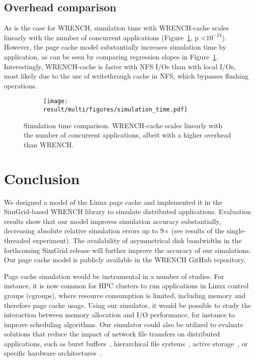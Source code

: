 \documentclass[conference]{IEEEtran}
\newcommand{\simgrid}{SimGrid\xspace}
\newcommand{\wrench}{WRENCH\xspace}
\begin{document}
        \subsection{Overhead comparison}
        As is the case for \wrench, simulation time with \wrench-cache scales
        linearly with the number of concurrent applications
        (Figure~\ref{fig:multi_time}, p \textless $10^{-24}$). However, the page
        cache model substantially increases simulation time by
        application, as can be seen by comparing regression slopes in
        Figure~\ref{fig:multi_time}. Interestingly, \wrench-cache is faster with 
        NFS I/Os than with local I/Os, most likely due to the use of writethrough
        cache in NFS, which bypasses flushing operations.
        \begin{figure}
            \begin{subfigure}{\columnwidth}
                \centering
                \texttt{[image: result/multi/figures/simulation\_time.pdf]}
            \end{subfigure}
            \caption{Simulation time comparison. \wrench-cache scales
            linearly with the number of concurrent applications, albeit
            with a higher overhead than \wrench.}
            \label{fig:multi_time}
            \end{figure}


    \section{Conclusion}
    \label{discussion}
    We designed a model of the Linux page cache and implemented it in the
    \simgrid-based \wrench library to simulate distributed applications.
    Evaluation results show that our model improves simulation accuracy
    substantially, decreasing absolute relative simulation errors up to
    9$\times$ (see results of the single-threaded experiment). The
    availability of asymmetrical disk bandwidths in the forthcoming
    \simgrid release will further improve the accuracy of our simulations.
    Our page cache model is publicly available in the \wrench GitHub
    repository.

    Page cache simulation would be instrumental in a number of studies. For
    instance, it is now common for HPC clusters to run applications in
    Linux control groups (cgroups), where resource consumption is limited, including
    memory and therefore page cache usage. Using our simulator,
    it would be possible to study the interaction between memory allocation
    and I/O performance, for instance to improve scheduling algorithms.
    Our simulator could also be utilized to evaluate solutions that
    reduce the impact of network file transfers on distributed
    applications, such as burst
    buffers~\cite{ferreiradasilva-fgcs-bb-2019}, hierarchical file
    systems~\cite{islam2015triple}, active storage~\cite{5496981}, or specific
    hardware architectures~\cite{hayot2020performance}. 
\end{document}
